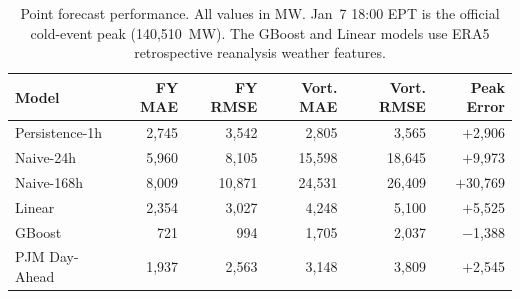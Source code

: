 \begin{table}[htbp]
\centering
\caption{Point forecast performance. All values in MW. Jan~7 18:00 EPT is the official cold-event peak (140,510~MW). The GBoost and Linear models use ERA5 retrospective reanalysis weather features.}
\label{tab:point_metrics}
\begin{tabular}{lrrrrr}
\toprule
Model & FY MAE & FY RMSE & Vort. MAE & Vort. RMSE & Peak Error \\
\midrule
Persistence-1h & 2,745 & 3,542 & 2,805 & 3,565 & $+$2,906 \\
Naive-24h & 5,960 & 8,105 & 15,598 & 18,645 & $+$9,973 \\
Naive-168h & 8,009 & 10,871 & 24,531 & 26,409 & $+$30,769 \\
Linear & 2,354 & 3,027 & 4,248 & 5,100 & $+$5,525 \\
GBoost & 721 & 994 & 1,705 & 2,037 & $-$1,388 \\
PJM Day-Ahead & 1,937 & 2,563 & 3,148 & 3,809 & $+$2,545 \\
\bottomrule
\end{tabular}
\end{table}